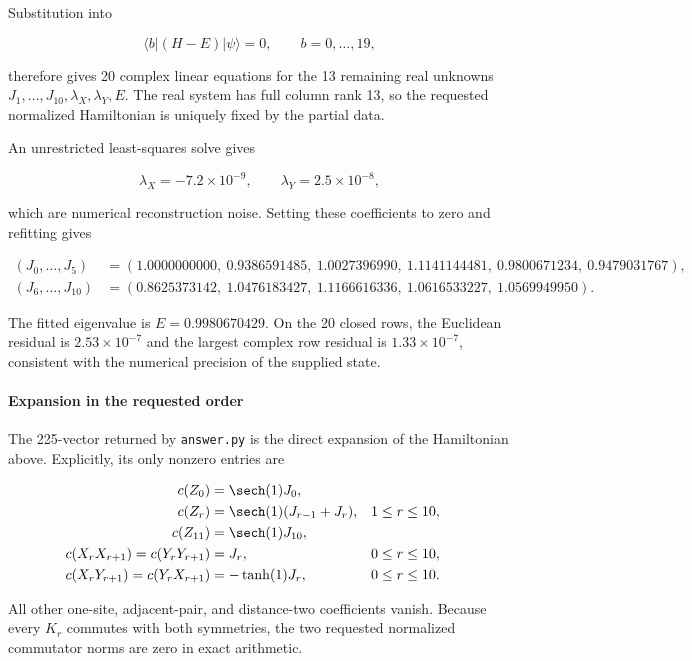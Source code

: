 Substitution into

\[
\langle b|(H-E)|\psi\rangle=0,
\qquad b=0,\ldots,19,
\]

therefore gives 20 complex linear equations for the 13 remaining real
unknowns $J_1,\ldots,J_{10},\lambda_X,\lambda_Y,E$. The real system has full
column rank 13, so the requested normalized Hamiltonian is uniquely fixed by
the partial data.

An unrestricted least-squares solve gives

\[
\lambda_X=-7.2\times10^{-9},
\qquad
\lambda_Y=2.5\times10^{-8},
\]

which are numerical reconstruction noise. Setting these coefficients to zero
and refitting gives

\[
\begin{aligned}
(J_0,\ldots,J_5)&=(1.0000000000,\ 0.9386591485,\ 1.0027396990,\
1.1141144481,\ 0.9800671234,\ 0.9479031767),\\
(J_6,\ldots,J_{10})&=(0.8625373142,\ 1.0476183427,\ 1.1166616336,\
1.0616533227,\ 1.0569949950).
\end{aligned}
\]

The fitted eigenvalue is $E=0.9980670429$. On the 20 closed rows, the
Euclidean residual is $2.53\times10^{-7}$ and the largest complex row residual
is $1.33\times10^{-7}$, consistent with the numerical precision of the
supplied state.

\paragraph*{Expansion in the requested order}

The 225-vector returned by \texttt{answer.py} is the direct expansion of the
Hamiltonian above. Explicitly, its only nonzero entries are

\[
\begin{aligned}
c(Z_0)&=\sech(1)J_0,\\
c(Z_r)&=\sech(1)(J_{r-1}+J_r), &&1\le r\le10,\\
c(Z_{11})&=\sech(1)J_{10},\\
c(X_rX_{r+1})=c(Y_rY_{r+1})&=J_r, &&0\le r\le10,\\
c(X_rY_{r+1})=c(Y_rX_{r+1})&=-\tanh(1)J_r, &&0\le r\le10.
\end{aligned}
\]

All other one-site, adjacent-pair, and distance-two coefficients vanish.
Because every $K_r$ commutes with both symmetries, the two requested normalized
commutator norms are zero in exact arithmetic.
